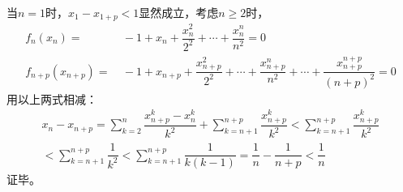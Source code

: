 \begin{enumerate}[label={【\textbf{例\thechapter.\arabic*}】},
 leftmargin=\inteval{\myenumleftmargin}pt,
 itemsep=\inteval{\myenumitempsep}pt,
 itemindent=\inteval{\myenumitemindent}pt]
当$ n=1 $时，$ x_1-x_{1+p}<1 $显然成立，考虑$ n\geq 2 $时，
\begin{align*}  %
    f_n(x_n)=&\ -1+x_n+\dfrac{x_n^2}{2^2}+\cdots+
    \dfrac{x_n^n}{n^2}=0  \\
    f_{n+p}(x_{n+p})=&\ -1+x_{n+p}+\dfrac{x_{n+p}^2}{2^2}+\cdots+
    \dfrac{x_{n+p}^n}{n^2}+\cdots+\dfrac{x_{n+p}^{n+p}}{(n+p)^2}
    =0 
\end{align*}
用以上两式相减：
\begin{gather}
    x_{n}-x_{n+p}=\sum_{k=2}^{n}\dfrac{x_{n+p}^k-x_{n}^k}{k^2}
    +\sum_{k=n+1}^{n+p}\dfrac{x_{n+p}^k}{k^2}< 
    \sum_{k=n+1}^{n+p}\dfrac{x_{n+p}^k}{k^2} \nonumber \\
    < \sum_{k=n+1}^{n+p}\dfrac{1}{k^2}<
    \sum_{k=n+1}^{n+p}\dfrac{1}{k(k-1)}=
    \dfrac{1}{n}-\dfrac{1}{n+p}<\dfrac{1}{n} \label{2013安徽数列收敛1}
\end{gather} 
证毕。


\end{enumerate}
